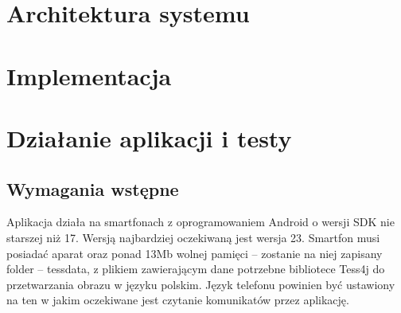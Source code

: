 \documentclass[eng,oneside]{mgr}
\begin{document}
\chapter{Architektura systemu}
\chapter{Implementacja}
\chapter{Działanie aplikacji i testy}
\section {Wymagania wstępne}
\hspace{1cm} Aplikacja działa na smartfonach z oprogramowaniem Android o wersji SDK nie starszej niż 17. Wersją najbardziej oczekiwaną jest wersja 23. Smartfon musi posiadać aparat oraz ponad 13Mb wolnej pamięci – zostanie na niej zapisany folder – tessdata, z plikiem zawierającym dane potrzebne bibliotece Tess4j do przetwarzania obrazu w języku polskim. Język telefonu powinien być ustawiony na ten w jakim oczekiwane jest czytanie komunikatów przez aplikację. 
\end{document}
